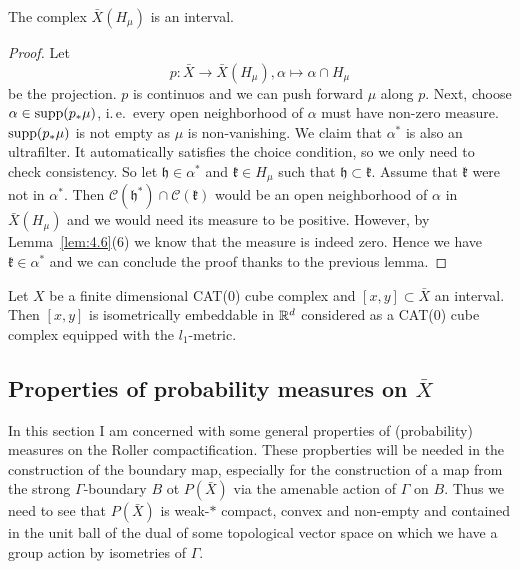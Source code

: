 \begin{lemma}[{\cite[Lem. 4.7]{MR3509968}}]
  \label{lem:interval}
  The complex \(\bar X(H_\mu)\) is an interval.
\end{lemma}

\begin{proof}
  Let
  \[
    p \colon \bar X \to \bar X (H_\mu), \alpha \mapsto \alpha \cap H_\mu
  \]
  be the projection. \(p\) is continuos and we can push forward \(\mu\) along \(p\). Next, choose \(\alpha \in \operatorname{supp}(p_\ast \mu)\), i.\,e.\ every open neighborhood of \(\alpha\) must have non-zero measure. \(\operatorname{supp}(p_\ast \mu)\) is not empty as \(\mu\) is non-vanishing. We claim that \(\alpha^\ast\) is also an ultrafilter. It automatically satisfies the choice condition, so we only need to check consistency. So let \(\mathfrak{h} \in \alpha^\ast\) and \(\mathfrak{k} \in H_\mu\) such that \(\mathfrak{h} \subset \mathfrak{k}\). Assume that \(\mathfrak{k}\) were not in \(\alpha^\ast\). Then \(\mathcal{C}(\mathfrak{h^\ast}) \cap \mathcal{C}(\mathfrak{k})\) would be an open neighborhood of \(\alpha\) in \(\bar X(H_\mu)\) and we would need its measure to be positive. However, by Lemma~\ref{lem:4.6}(6) we know that the measure is indeed zero. Hence we have \(\mathfrak{k} \in \alpha^\ast\) and we can conclude the proof thanks to the previous lemma.
\end{proof}

\begin{thm}
  \label{thm:interval}
  Let \(X\) be a finite dimensional CAT(0) cube complex and \([x,y] \subset \bar X\) an interval. Then \([x,y]\) is isometrically embeddable in \(\mathbb{R}^d\) considered as a CAT(0) cube complex equipped with the \(l_1\)-metric.
\end{thm}


\subsection{Properties of probability measures on \(\bar X\)}
\label{sec:prob}

In this section I am concerned with some general properties of (probability) measures on the Roller compactification. These propberties will be needed in the construction of the boundary map, especially for the construction of a map from the strong \(\Gamma\)-boundary \(B\) ot \(P(\bar X)\) via the amenable action of \(\Gamma\) on \(B\). Thus we need to see that \(P(\bar X)\) is weak-\(\ast\) compact, convex and non-empty and contained in the unit ball of the dual of some topological vector space on which we have a group action by isometries of \(\Gamma\).

